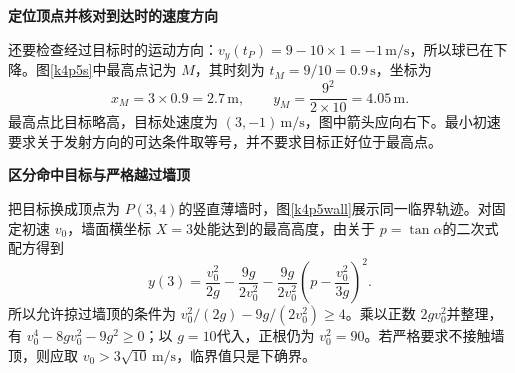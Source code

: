 \begin{solution}
\par\medskip{}\noindent\textbf{定位顶点并核对到达时的速度方向}\par\nobreak
还要检查经过目标时的运动方向：$v_y(t_P)=9-10\times1=-1\,\mathrm{m/s}$，所以球已在下降。图\ref{k4p5s}中最高点记为 $M$，其时刻为 $t_M=9/10=0.9\,\mathrm s$，坐标为
\[x_M=3\times0.9=2.7\,\mathrm m,\qquad
y_M=\frac{9^2}{2\times10}=4.05\,\mathrm m.\]
最高点比目标略高，目标处速度为 $(3,-1)\,\mathrm{m/s}$，图中箭头应向右下。最小初速要求关于发射方向的可达条件取等号，并不要求目标正好位于最高点。



\par\medskip{}\noindent\textbf{区分命中目标与严格越过墙顶}\par\nobreak
把目标换成顶点为 $P(3,4)$的竖直薄墙时，图\ref{k4p5wall}展示同一临界轨迹。对固定初速 $v_0$，墙面横坐标 $X=3$处能达到的最高高度，由关于 $p=\tan\alpha$的二次式配方得到
\[y(3)=\frac{v_0^2}{2g}-\frac{9g}{2v_0^2}
 -\frac{9g}{2v_0^2}\left(p-\frac{v_0^2}{3g}\right)^2.
\]
所以允许掠过墙顶的条件为 $v_0^2/(2g)-9g/(2v_0^2)\ge4$。乘以正数 $2gv_0^2$并整理，有 $v_0^4-8gv_0^2-9g^2\ge0$；以 $g=10$代入，正根仍为 $v_0^2=90$。若严格要求不接触墙顶，则应取 $v_0>3\sqrt{10}\,\mathrm{m/s}$，临界值只是下确界。
\end{solution}
